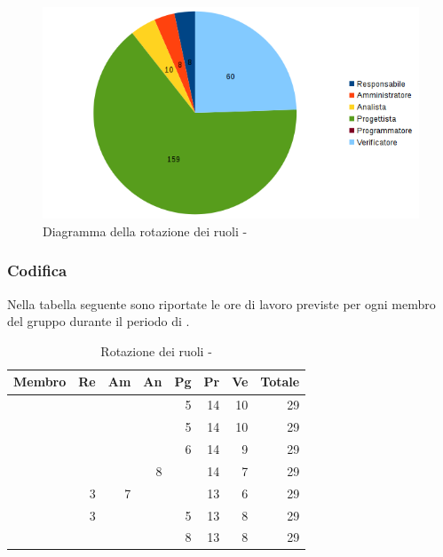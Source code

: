\documentclass[12pt,a4paper]{article}
\begin{document}
\begin{center}
	\begin{figure}[H]
		\centering	\includegraphics[width=\textwidth]{../img/diagrammaTortaProgettazioneArchitetturaleTotaleOre.png}
		\caption{Diagramma della rotazione dei ruoli - \FPA{}}
	\end{figure}
\end{center}

\newpage
\subsubsection{Codifica}

Nella tabella seguente sono riportate le ore di lavoro previste per ogni membro del gruppo durante il periodo di \FC.

\begin{table}[H]
	\begin{center}
		\begin{tabular}{l r r r r r r r}
			\toprule
			\textbf{Membro}	&	\textbf{Re}	&	\textbf{Am}	& \textbf{An} & \textbf{Pg} & \textbf{Pr} & \textbf{Ve} & \textbf{Totale}\\
			\midrule
			\midrule
			\IB{} & & & & 5 & 14 & 10 & 29 \\
			\midrule
			\AB{} & & & & 5 & 14 & 10 & 29 \\
			\midrule
			\NDC{} & & & & 6 & 14 & 9 & 29 \\
			\midrule
			\TP{} & & & 8 & & 14 & 7 & 29 \\
			\midrule
			\WS{} & 3 & 7 & & & 13 & 6 & 29 \\
			\midrule
			\AVE{} & 3 & & & 5 & 13 & 8 & 29 \\
			\midrule
			\AVI{} & & & & 8 & 13 & 8 & 29 \\
			\bottomrule
		\end{tabular}
		\caption{Rotazione dei ruoli - \FPDC{}}
	\end{center}
\end{table}
\end{document}
